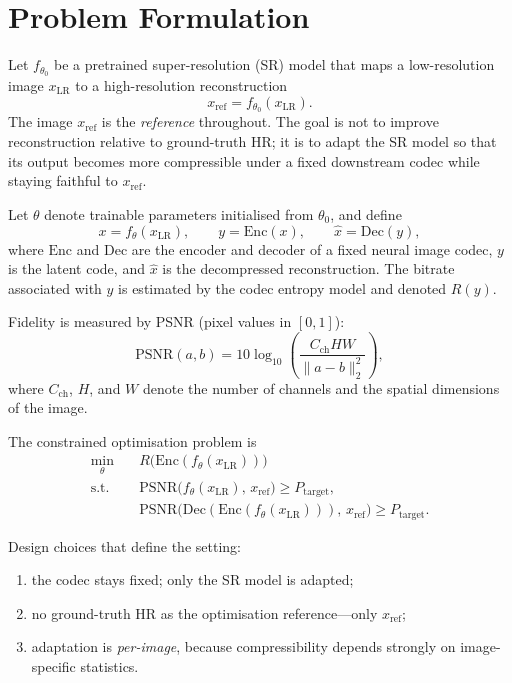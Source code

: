\section{Problem Formulation}
\label{sec:problem}

Let \(f_{\theta_0}\) be a pretrained super-resolution (SR) model that maps a low-resolution image \(x_{\mathrm{LR}}\) to a high-resolution reconstruction
\begin{equation}
  x_{\mathrm{ref}} = f_{\theta_0}(x_{\mathrm{LR}}).
\end{equation}
The image \(x_{\mathrm{ref}}\) is the \emph{reference} throughout. The goal is not to improve reconstruction relative to ground-truth HR; it is to adapt the SR model so that its output becomes more compressible under a fixed downstream codec while staying faithful to \(x_{\mathrm{ref}}\).

Let \(\theta\) denote trainable parameters initialised from \(\theta_0\), and define
\begin{equation}
  x = f_{\theta}(x_{\mathrm{LR}}), \qquad
  y = \mathrm{Enc}(x), \qquad
  \hat{x} = \mathrm{Dec}(y),
  \label{eq:pipeline}
\end{equation}
where \(\mathrm{Enc}\) and \(\mathrm{Dec}\) are the encoder and decoder of a fixed neural image codec, \(y\) is the latent code, and \(\hat{x}\) is the decompressed reconstruction. The bitrate associated with \(y\) is estimated by the codec entropy model and denoted \(R(y)\).

Fidelity is measured by PSNR (pixel values in \([0,1]\)):
\begin{equation}
  \mathrm{PSNR}(a,b)
  = 10\log_{10}\!\left(\frac{C_{\mathrm{ch}} H W}{\|a-b\|_2^2}\right),
\end{equation}
where \(C_{\mathrm{ch}}\), \(H\), and \(W\) denote the number of channels and the spatial dimensions of the image.

The constrained optimisation problem is
\begin{equation}
  \begin{aligned}
    \min_{\theta}\quad
    & R\!\bigl(\mathrm{Enc}(f_{\theta}(x_{\mathrm{LR}}))\bigr) \\
    \text{s.t.}\quad
    & \mathrm{PSNR}\bigl(f_{\theta}(x_{\mathrm{LR}}),\, x_{\mathrm{ref}}\bigr)
      \ge P_{\mathrm{target}}, \\
    & \mathrm{PSNR}\bigl(\mathrm{Dec}(\mathrm{Enc}(f_{\theta}(x_{\mathrm{LR}}))),\, x_{\mathrm{ref}}\bigr)
      \ge P_{\mathrm{target}}.
  \end{aligned}
  \label{eq:compression_aware_problem}
\end{equation}

Design choices that define the setting:
\begin{enumerate}
    \item the codec stays fixed; only the SR model is adapted;
    \item no ground-truth HR as the optimisation reference---only \(x_{\mathrm{ref}}\);
    \item adaptation is \emph{per-image}, because compressibility depends strongly on image-specific statistics.
\end{enumerate}
